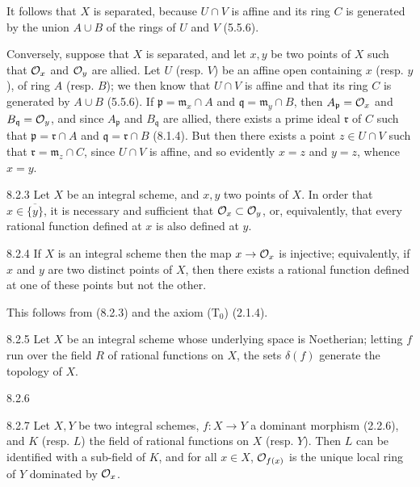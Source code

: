 \documentclass[../main.tex]{subfiles}
\begin{document}
It follows that $X$ is separated, because $U\cap V$ is affine and its ring $C$ is generated by the union $A\cup B$ of the rings of $U$ and $V$ (5.5.6).

Conversely, suppose that $X$ is separated, and let $x,y$ be two points of $X$ such that $\mathcal{O}_x$ and $\mathcal{O}_y$ are allied.
Let $U$ (resp. $V$) be an affine open containing $x$ (resp. $y$), of ring $A$ (resp. $B$); we then know that $U\cap V$ is affine and that its ring $C$ is generated by $A\cup B$ (5.5.6).
If $\mathfrak{p}=\mathfrak{m}_x\cap A$ and $\mathfrak{q}=\mathfrak{m}_y\cap B$, then $A_\mathfrak{p}=\mathcal{O}_x$ and $B_\mathfrak{q}=\mathcal{O}_y$, and since $A_\mathfrak{p}$ and $B_\mathfrak{q}$ are allied, there exists a prime ideal $\mathfrak{r}$ of $C$ such that $\mathfrak{p}=\mathfrak{r}\cap A$ and $\mathfrak{q}=\mathfrak{r}\cap B$ (8.1.4).
But then there exists a point $z\in U\cap V$ such that $\mathfrak{r}=\mathfrak{m}_z\cap C$, since $U\cap V$ is affine, and so evidently $x=z$ and $y=z$, whence $x=y$.

\begin{cx}[Corollary]{8.2.3}
    Let $X$ be an integral scheme, and $x,y$ two points of $X$.
    In order that $x\in\overline{\{y\}}$, it is necessary and sufficient that $\mathcal{O}_x\subset\mathcal{O}_y$, or, equivalently, that every rational function defined at $x$ is also defined at $y$.
\end{cx}

\begin{cx}[Corollary]{8.2.4}
    If $X$ is an integral scheme then the map $x\to\mathcal{O}_x$ is injective; equivalently, if $x$ and $y$ are two distinct points of $X$, then there exists a rational function defined at one of these points but not the other.
\end{cx}

This follows from (8.2.3) and the axiom ($\mathrm{T}_0$) (2.1.4).

\begin{cx}[Corollary]{8.2.5}
    Let $X$ be an integral scheme whose underlying space is Noetherian; letting $f$ run over the field $R$ of rational functions on $X$, the sets $\delta(f)$ generate the topology of $X$.
\end{cx}

\begin{cx}{8.2.6}
\end{cx}

\begin{cx}[Proposition]{8.2.7}
    Let $X,Y$ be two integral schemes, $f\colon X\to Y$ a dominant morphism (2.2.6), and $K$ (resp. $L$) the field of rational functions on $X$ (resp. $Y$).
    Then $L$ can be identified with a sub-field of $K$, and for all $x\in X$, $\mathcal{O}_{f(x)}$ is the unique local ring of $Y$ dominated by $\mathcal{O}_x$.
\end{cx}
\end{document}
